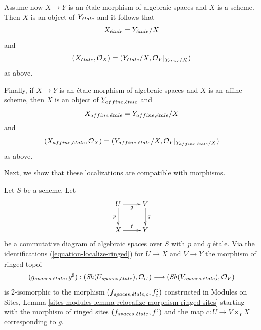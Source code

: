 \medskip\noindent
Assume now $X \to Y$ is an \'etale morphism of algebraic spaces and $X$ is
a scheme. Then $X$ is an object of $Y_{\acute{e}tale}$ and it follows that
\begin{equation}
\label{equation-localize-at-scheme}
X_{\acute{e}tale} = Y_{\acute{e}tale}/X
\end{equation}
and
\begin{equation}
\label{equation-localize-at-scheme-ringed}
(X_{\acute{e}tale}, \mathcal{O}_X) =
(Y_{\acute{e}tale}/X, \mathcal{O}_Y|_{Y_{\acute{e}tale}/X})
\end{equation}
as above.

\medskip\noindent
Finally, if $X \to Y$ is an \'etale morphism of algebraic spaces and $X$ is
an affine scheme, then $X$ is an object of $Y_{affine, {\acute{e}tale}}$ and
\begin{equation}
\label{equation-localize-at-affine}
X_{affine, {\acute{e}tale}} = Y_{affine, {\acute{e}tale}}/X
\end{equation}
and
\begin{equation}
\label{equation-localize-at-affine-ringed}
(X_{affine, {\acute{e}tale}}, \mathcal{O}_X) =
(Y_{affine, {\acute{e}tale}}/X, \mathcal{O}_Y|_{Y_{affine, {\acute{e}tale}}/X})
\end{equation}
as above.

\medskip\noindent
Next, we show that these localizations are compatible with morphisms.

\begin{lemma}
\label{lemma-relocalize-morphism}
Let $S$ be a scheme. Let
$$
\xymatrix{
U \ar[d]_p \ar[r]_g & V \ar[d]^q \\
X \ar[r]^f & Y
}
$$
be a commutative diagram of algebraic spaces over $S$ with $p$ and $q$ \'etale.
Via the identifications
(\ref{equation-localize-ringed}) for $U \to X$ and $V \to Y$
the morphism of ringed topoi
$$
(g_{spaces, {\acute{e}tale}}, g^\sharp) :
(\mathop{\mathit{Sh}}\nolimits(U_{spaces, {\acute{e}tale}}), \mathcal{O}_U)
\longrightarrow
(\mathop{\mathit{Sh}}\nolimits(V_{spaces, {\acute{e}tale}}), \mathcal{O}_V)
$$
is $2$-isomorphic to the morphism $(f_{spaces, {\acute{e}tale}, c}, f_c^\sharp)$
constructed in
Modules on Sites,
Lemma \ref{sites-modules-lemma-relocalize-morphism-ringed-sites}
starting with the morphism of ringed sites
$(f_{spaces, {\acute{e}tale}}, f^\sharp)$ and
the map $c : U \to V \times_Y X$ corresponding to $g$.
\end{lemma}

